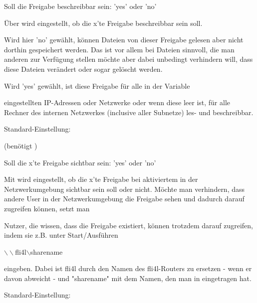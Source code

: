 \begin{description}

    Soll die Freigabe beschreibbar sein: 'yes' oder 'no'

        Über  wird eingestellt, ob die x'te Freigabe
        beschreibbar sein soll.

        Wird hier 'no' gewählt, können Dateien von dieser Freigabe gelesen aber
        nicht dorthin gespeichert werden. Das ist vor allem bei Dateien
        sinnvoll, die man anderen zur Verfügung stellen möchte aber dabei
        unbedingt verhindern will, dass diese Dateien verändert oder sogar
        gelöscht werden.

        Wird 'yes' gewählt, ist diese Freigabe für alle in der Variable

        \var{SAMBA\_SHARE\_NET\_x]}

        eingestellten IP-Adressen oder Netzwerke oder wenn diese leer ist, für
        alle Rechner des internen Netzwerkes (inclusive aller Subnetze)
        les- und beschreibbar.

        Standard-Einstellung: 

\end{description}

\begin{description}
 (benötigt )

    Soll die x'te Freigabe sichtbar sein: 'yes' oder 'no'

        Mit  wird eingestellt, ob die x'te Freigabe bei
        aktiviertem  in der Netzwerkumgebung sichtbar sein soll oder
        nicht.
        Möchte man verhindern, dass andere User in der Netzwerkumgebung die
        Freigabe sehen und dadurch darauf zugreifen können, setzt man


        Nutzer, die wissen, dass die Freigabe existiert, können trotzdem
        darauf zugreifen, indem sie z.B. unter Start/Ausführen

            $\backslash\backslash$fli4l$\backslash$sharename

        eingeben. Dabei ist \dq{}fli4l\dq{} durch den Namen des fli4l-Routers zu
        ersetzen - wenn er davon abweicht - und "sharename" mit dem Namen,
        den man in  eingetragen hat.

        Standard-Einstellung: 

\end{description}

